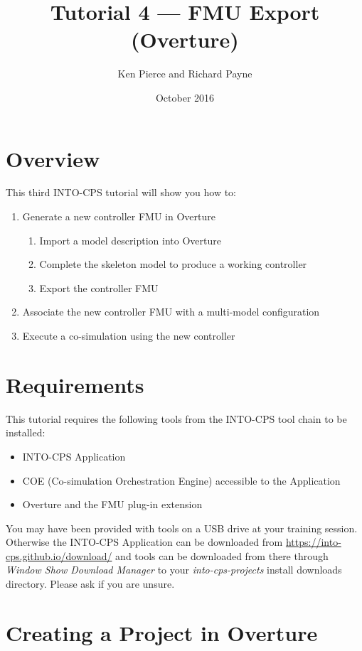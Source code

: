 \documentclass[11pt,a4paper]{../tutorial}
\title{Tutorial 4 --- FMU Export (Overture)}
\date{October 2016}
\author{Ken Pierce and Richard Payne}
\begin{document}
\section*{Overview}

This third INTO-CPS tutorial will show you how to:

\begin{enumerate}[noitemsep]
\item Generate a new controller FMU in Overture
    \begin{enumerate}[noitemsep]
        \item Import a model description into Overture
        \item Complete the skeleton model to produce a working controller
        \item Export the controller FMU
    \end{enumerate}
\item Associate the new controller FMU with a multi-model configuration
\item Execute a co-simulation using the new controller
\end{enumerate}


\section*{Requirements}

This tutorial requires the following tools from the INTO-CPS tool chain to be installed:

\begin{itemize}[noitemsep]
\item INTO-CPS Application
\item COE (Co-simulation Orchestration Engine) accessible to the Application
\item Overture and the FMU plug-in extension
\end{itemize}

You may have been provided with tools on a USB drive at your training session. Otherwise the INTO-CPS Application can be downloaded from \url{https://into-cps.github.io/download/} and tools can be downloaded from there through \emph{Window \menusep Show Download Manager} to your \emph{into-cps-projects} install downloads directory. Please ask if you are unsure.

\section{Creating a Project in Overture}
\end{document}
